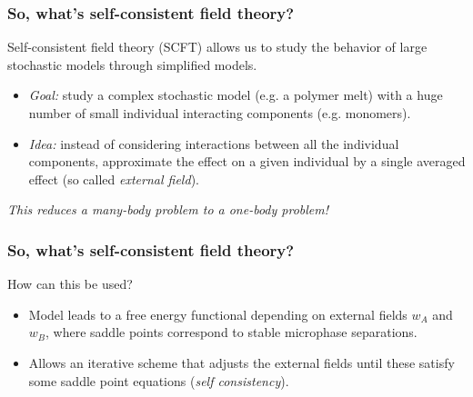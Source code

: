 \begin{frame}[t]
    \frametitle{So, what's self-consistent field theory?}

    Self-consistent field theory (SCFT) allows us to study the behavior of large stochastic models through simplified models.

    \vfill
    \begin{itemize}
        \item {} \emph{Goal:} study a complex stochastic model (e.g. a polymer melt) with a huge number of small individual interacting components (e.g. monomers).
        \item {} \emph{Idea:} instead of considering interactions between all the individual components, approximate the effect on a given individual by a single averaged effect (so called \emph{external field}).
    \end{itemize}

    \vfill
    \centering
    \emph{This reduces a many-body problem to a one-body problem!}
\end{frame}

\begin{frame}[t]
    \frametitle{So, what's self-consistent field theory?}

    How can this be used?


    \begin{itemize}
        \item Model leads to a free energy functional depending on external fields $w_{A}$ and $w_{B}$, where saddle points correspond to stable microphase separations.
        \item {} Allows an iterative scheme that adjusts the external fields until these satisfy some saddle point equations (\emph{self consistency}).
    \end{itemize}
\end{frame}

